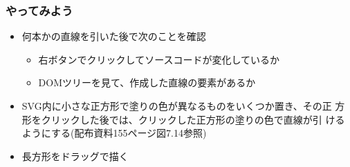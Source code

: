 \begin{frame}[containsverbatim]
 \frametitle{やってみよう}
 \begin{itemize}
   \item 何本かの直線を引いた後で次のことを確認
  \begin{itemize}
  \item 右ボタンでクリックしてソースコードが変化しているか
   \item DOMツリーを見て、作成した直線の要素があるか
  \end{itemize}
	\item SVG内に小さな正方形で塗りの色が異なるものをいくつか置き、その正
				方形をクリックした後では、クリックした正方形の塗りの色で直線が引
				けるようにする(配布資料155ページ図7.14参照)
	\item 長方形をドラッグで描く
 \end{itemize}
\end{frame}

\begin{frame}[containsverbatim]
 \frametitle{}
\end{frame}
